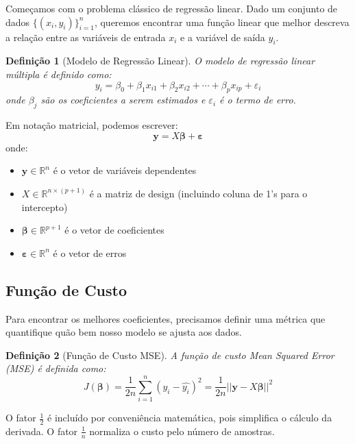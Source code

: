 \documentclass[a4paper,12pt]{article}
\newtheorem{definicao}{Definição}[section]
\begin{document}
Começamos com o problema clássico de regressão linear. Dado um conjunto de dados $\{(x_i, y_i)\}_{i=1}^n$, queremos encontrar uma função linear que melhor descreva a relação entre as variáveis de entrada $x_i$ e a variável de saída $y_i$.

\begin{definicao}[Modelo de Regressão Linear]
O modelo de regressão linear múltipla é definido como:
\begin{equation}
    y_i = \beta_0 + \beta_1 x_{i1} + \beta_2 x_{i2} + \cdots + \beta_p x_{ip} + \varepsilon_i
\end{equation}
onde $\beta_j$ são os coeficientes a serem estimados e $\varepsilon_i$ é o termo de erro.
\end{definicao}

Em notação matricial, podemos escrever:
\begin{equation}
    \mathbf{y} = X\boldsymbol{\beta} + \boldsymbol{\varepsilon}
\end{equation}
onde:
\begin{itemize}
    \item $\mathbf{y} \in \mathbb{R}^n$ é o vetor de variáveis dependentes
    \item $X \in \mathbb{R}^{n \times (p+1)}$ é a matriz de design (incluindo coluna de 1's para o intercepto)
    \item $\boldsymbol{\beta} \in \mathbb{R}^{p+1}$ é o vetor de coeficientes
    \item $\boldsymbol{\varepsilon} \in \mathbb{R}^n$ é o vetor de erros
\end{itemize}

\subsection{Função de Custo}

Para encontrar os melhores coeficientes, precisamos definir uma métrica que quantifique quão bem nosso modelo se ajusta aos dados.

\begin{definicao}[Função de Custo MSE]
A função de custo Mean Squared Error (MSE) é definida como:
\begin{equation}
    J(\boldsymbol{\beta}) = \frac{1}{2n}\sum_{i=1}^{n}(y_i - \hat{y_i})^2 = \frac{1}{2n}||\mathbf{y} - X\boldsymbol{\beta}||^2
    \label{eq:mse}
\end{equation}
\end{definicao}

O fator $\frac{1}{2}$ é incluído por conveniência matemática, pois simplifica o cálculo da derivada. O fator $\frac{1}{n}$ normaliza o custo pelo número de amostras.
\end{document}
